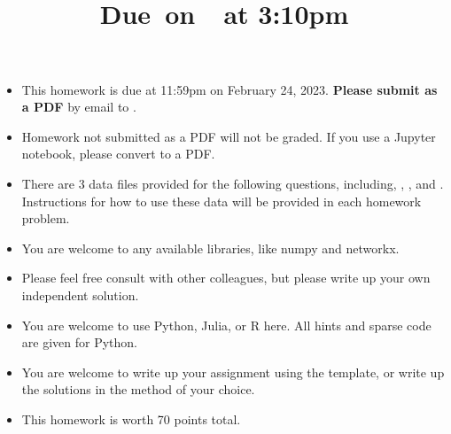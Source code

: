 \documentclass{article}
\title{
    \vspace{2in}
    \textmd{\textbf{\hmwkClass\hmwkTitle}}\\
    \normalsize\vspace{0.1in}\small{Due\ on\ \hmwkDueDate\ at 3:10pm}\\
    \vspace{3in}
}
\author{\hmwkAuthorName}
\date{}
\begin{document}

\begin{itemize}
\item This homework is due at 11:59pm on February 24, 2023. {\bf Please submit as a PDF} by email to . 
\item Homework not submitted as a PDF will not be graded. If you use a Jupyter notebook, please convert to a PDF. 
\item There are 3 data files provided for the following questions, including, , , and . Instructions for how to use these data will be provided in each homework problem. 
\item You are welcome to any available libraries, like numpy and networkx.
\item Please feel free consult with other colleagues, but please write up your own independent solution. 
\item You are welcome to use Python, Julia, or R here. All hints and sparse code are given for Python.
\item You are welcome to write up your assignment using the  template, or write up the solutions in the method of your choice. 
\item This homework is worth 70 points total. 
\end{itemize}
\end{document}
